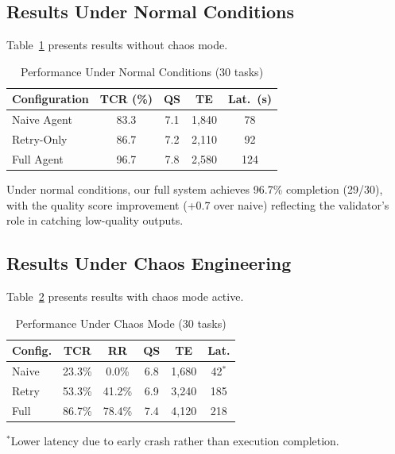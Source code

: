 \documentclass[conference]{IEEEtran}
\begin{document}
\subsection{Results Under Normal Conditions}

Table~\ref{tab:normal} presents results without chaos mode.

\begin{table}[htbp]
    \caption{Performance Under Normal Conditions (30 tasks)}
    \label{tab:normal}
    \centering
    \begin{tabular}{@{}lcccc@{}}
        \toprule
        \textbf{Configuration} & \textbf{TCR (\%)} & \textbf{QS} & \textbf{TE} & \textbf{Lat.\ (s)} \\
        \midrule
        Naive Agent & 83.3 & 7.1 & 1,840 & 78 \\
        Retry-Only & 86.7 & 7.2 & 2,110 & 92 \\
        Full Agent & 96.7 & 7.8 & 2,580 & 124 \\
        \bottomrule
    \end{tabular}
\end{table}

Under normal conditions, our full system achieves 96.7\% completion (29/30), with the quality score improvement (+0.7 over naive) reflecting the validator's role in catching low-quality outputs.

\subsection{Results Under Chaos Engineering}

Table~\ref{tab:chaos} presents results with chaos mode active.

\begin{table}[htbp]
    \caption{Performance Under Chaos Mode (30 tasks)}
    \label{tab:chaos}
    \centering
    \begin{tabular}{@{}lccccc@{}}
        \toprule
        \textbf{Config.} & \textbf{TCR} & \textbf{RR} & \textbf{QS} & \textbf{TE} & \textbf{Lat.} \\
        \midrule
        Naive & 23.3\% & 0.0\% & 6.8 & 1,680 & 42$^*$ \\
        Retry & 53.3\% & 41.2\% & 6.9 & 3,240 & 185 \\
        Full & 86.7\% & 78.4\% & 7.4 & 4,120 & 218 \\
        \bottomrule
    \end{tabular}
    \begin{flushleft}
        \small $^*$Lower latency due to early crash rather than execution completion.
    \end{flushleft}
\end{table}
\end{document}
